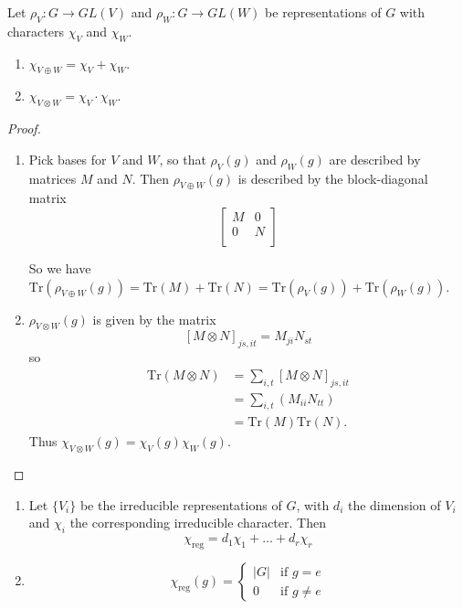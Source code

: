 \begin{prop}
Let $\rho_V \colon G \to GL(V)$ and $\rho_W \colon G \to GL(W)$ be representations of $G$ with characters $\chi_V$ and $\chi_W$.
\begin{enumerate}
\item $\chi _{V \oplus W} = \chi_V + \chi_W$.
\item $\chi_{V \otimes W} = \chi_V \cdot \chi_W$.
\end{enumerate}
\end{prop}
\begin{proof}
\begin{enumerate}
\item Pick bases for $V$ and $W$, so that $\rho_V (g)$ and $\rho_W (g)$ are described by matrices $M$ and $N$.  Then $\rho_{V \oplus W} (g)$ is described by the block-diagonal matrix
\[ \begin{bmatrix}
M & 0 \\
0 & N \\
\end{bmatrix} \]

So we have $\text{Tr} (\rho_{V \oplus W} (g)) = \text{Tr} (M) + \text{Tr}(N) = \text{Tr}(\rho_V (g)) + \text{Tr} (\rho_W (g))$.
\item $\rho_ {V \otimes W}(g)$ is given by the matrix
\[ [M \otimes N ]_{js, it} = M_{ji} N_{st} \]
so
\begin{align*}
\text{Tr} (M \otimes N) &= \sum_{i,t} [M \otimes N]_{js,it} \\
	&= \sum_{i,t} (M_{ii} N_{tt}) \\
	&= \text{Tr} (M) \text{Tr} (N).
\end{align*}
Thus $\chi_{V \otimes W} (g)= \chi_V (g) \chi_W(g)$.
\end{enumerate}
\end{proof}

\begin{prop}
\begin{enumerate}
\item Let $\{ V_i \}$ be the irreducible representations of $G$, with $d_i$  the dimension of  $V_i$ and $\chi_i$ the corresponding irreducible character.  Then
\[ \chi_{\text{reg}} = d_1 \chi_1 + \ldots + d_r \chi_r \]

\item \[  
\chi_{\text{reg}} (g) = \begin{cases} 
|G| &\mbox{if } g = e \\ 
0 & \mbox{if } g \neq e 
\end{cases}  \]

\end{enumerate}
\end{prop}